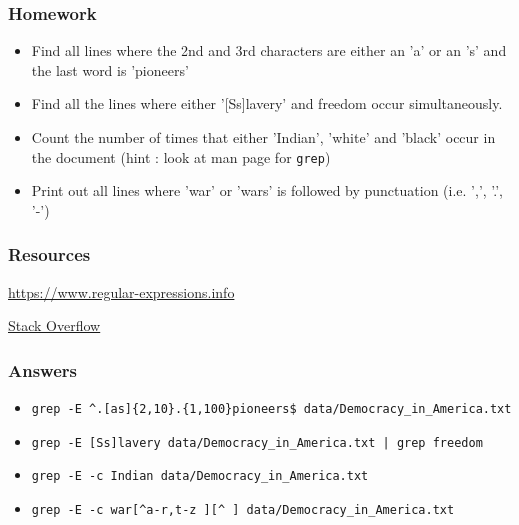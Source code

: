 \documentclass{beamer}
\newcommand{\code}[1]{\colorbox{codegray}{\texttt{#1}}}
\begin{document}
\begin{frame}
\frametitle{Homework}
\begin{itemize}
    \item Find all lines where the 2nd and 3rd characters are either an 'a' or an 's' and the last word is 'pioneers'
    \pause
    \item Find all the lines where either '[Ss]lavery' and freedom occur simultaneously.
    \pause
    \item Count the number of times that either 'Indian', 'white' and 'black' occur in the document (hint : look at man page for \code{grep})
    \pause
    \item Print out all lines where 'war' or 'wars' is followed by punctuation (i.e. ',', '.', '-')
\end{itemize}
\end{frame}





\begin{frame}
\frametitle{Resources}

\href{https://www.regular-expressions.info/}{https://www.regular-expressions.info}

\href{https://stackoverflow.com/}{Stack Overflow}

\end{frame}


\begin{frame}
\frametitle{Answers}
\begin{itemize}
    \item \code{grep -E \^{}.[as]\{2,10\}.\{1,100\}pioneers\$ data/Democracy\_in\_America.txt}
    \pause
    \item \code{grep -E [Ss]lavery data/Democracy\_in\_America.txt  | grep freedom}
    \pause
    \item \code{grep -E -c Indian data/Democracy\_in\_America.txt}
    \pause
    \item \code{grep -E -c war[\^{}a-r,t-z\ ][\^{}\ ] data/Democracy\_in\_America.txt}
\end{itemize}
\end{frame}
\end{document}
